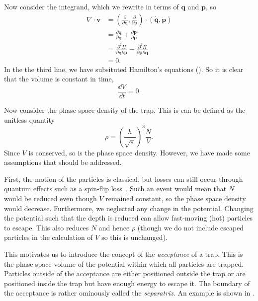 Now consider the integrand, which we rewrite in terms of $\mathbf{q}$ and
$\mathbf{p}$, so
%
\begin{align}
  \nabla \cdot \mathbf{v} &= \left(\frac{\partial}{\partial \mathbf{q}},
  \frac{\partial}{\partial \mathbf{p}}\right) \cdot \left(\dot{\mathbf{q}},
  \dot{\mathbf{p}}\right) \\
  &= \frac{\partial \dot{\mathbf{q}}}{\partial \mathbf{q}} +
  \frac{\partial \dot{\mathbf{p}}}{\partial \mathbf{p}} \\
  & = \frac{\partial^2 H}{\partial \mathbf{q} \partial \mathbf{p}}
  - \frac{\partial^2 H}{\partial \mathbf{p} \partial \mathbf{q}} \\
  & = 0.
\end{align}
In the the third line, we have subsituted Hamilton's equations
().  So it is clear that the volume is constant in
time,
%
\begin{equation}
  \frac{\dd V}{\dd t} = 0.
\end{equation}

Now consider the phase space density of the trap. This is can be defined as the
unitless quantity~\cite{}
%
\begin{equation}
  \rho = \left(\frac{h}{\sqrt{\pi}}\right)^3 \frac{N}{V}.
\end{equation}
%
Since $V$ is conserved, so is the phase space density. However, we have made
some assumptions that should be addressed.

First, the motion of the particles is classical, but losses can still occur
through quantum effects such as a spin-flip loss~\cite{}. Such an event would
mean that $N$ would be reduced even though $V$ remained constant, so the phase
space density would decrease. Furthermore, we neglected any change in the
potential.  Changing the potential such that the depth is reduced can allow
fast-moving (hot) particles to escape. This also reduces $N$ and hence $\rho$
(though we do not include escaped particles in the calculation of $V$ so this
is unchanged).

This motivates us to introduce the concept of the \emph{acceptance} of a trap.
This is the phase space volume of the potential within which all particles are
trapped. Particles outside of the acceptance are either positioned outside the
trap or are positioned inside the trap but have enough energy to escape it. The
boundary of the acceptance is rather ominously called the \emph{separatrix}. An
example is shown in .

